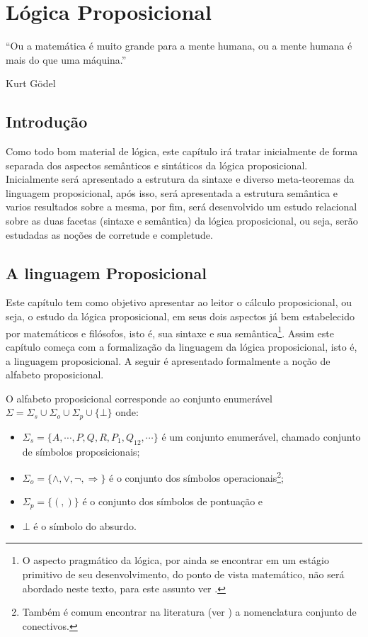 \chapter{Lógica Proposicional}\label{cap:LogicaProposicional}

\epigraph{``Ou a matemática é muito grande para a mente humana, ou a mente humana é mais do que uma máquina.''}{Kurt Gödel}

\section{Introdução}

Como todo bom material de lógica, este capítulo irá tratar inicialmente de forma separada dos aspectos semânticos e sintáticos da lógica proposicional. Inicialmente será apresentado a estrutura da sintaxe e diverso meta-teoremas da linguagem proposicional, após isso, será apresentada a estrutura semântica e varios resultados sobre a mesma, por fim, será desenvolvido um estudo relacional sobre as duas facetas (sintaxe e semântica) da lógica proposicional, ou seja, serão estudadas as noções de corretude e completude.  

\section{A linguagem Proposicional }\label{sec:LingProp}

Este capítulo tem como objetivo apresentar ao leitor o cálculo proposicional, ou seja, o estudo da lógica proposicional, em seus dois aspectos já bem estabelecido por matemáticos e filósofos, isto é,  sua sintaxe e sua semântica\footnote{O aspecto pragmático da lógica, por ainda se encontrar em um estágio primitivo de seu desenvolvimento, do ponto de vista matemático, não será abordado neste texto, para este assunto ver \cite{rodrigues2021, silva2018}.}. Assim este capítulo começa com a formalização da linguagem da lógica proposicional, isto é, a linguagem proposicional. A seguir é apresentado formalmente a noção de alfabeto proposicional.

\begin{definition}\label{def:AlfProp}
	O alfabeto proposicional corresponde ao conjunto enumerável $\Sigma = \Sigma_s \cup \Sigma_o \cup \Sigma_p \cup \{\bot\}$ onde:
	\begin{itemize}
		\item $\Sigma_s = \{A, \cdots, P, Q, R, P_1, Q_{12}, \cdots\}$ é um conjunto enumerável, chamado conjunto de símbolos proposicionais;
		\item $\Sigma_o = \{\land, \lor, \neg, \Rightarrow\}$ é o conjunto dos símbolos operacionais\footnote{Também é comum encontrar na literatura (ver \cite{joaoPavao2014}) a nomenclatura conjunto de conectivos.};
		\item $\Sigma_p = \{(, )\}$ é o conjunto dos símbolos de pontuação e
		\item $\bot$ é o símbolo do absurdo.
	\end{itemize}
\end{definition}

